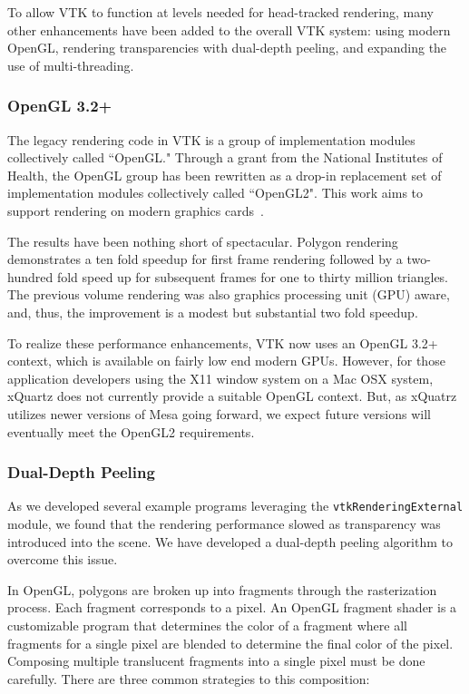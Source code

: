 To allow VTK to function at levels needed for head-tracked rendering,
many other enhancements have been added to the overall VTK system:
using modern OpenGL,
rendering transparencies with dual-depth peeling, and
expanding the use of multi-threading.

\subsubsection{OpenGL 3.2+}

The legacy rendering code in VTK is a group of implementation modules collectively called ``OpenGL."
Through a grant from the National Institutes of Health, the OpenGL group has
been rewritten as a drop-in replacement set of implementation modules
collectively called ``OpenGL2".
This work aims to support rendering on modern graphics cards~\cite{Hanwell:2015}.

The results have been nothing short of spectacular.
Polygon rendering demonstrates a ten fold speedup for first frame rendering followed by a two-hundred fold speed up for subsequent frames for one to thirty million triangles.
The previous volume rendering was also graphics processing unit (GPU) aware, and, thus, the improvement is a modest but substantial two fold speedup. 

To realize these performance enhancements, VTK now uses an OpenGL 3.2+ context, which is available on fairly low end modern GPUs.
However, for those application developers using the X11 window system on a Mac OSX system, xQuartz does not currently provide a suitable OpenGL context.
But, as xQuatrz utilizes newer versions of Mesa going forward, we expect future versions will eventually meet the OpenGL2 requirements.

\subsubsection{Dual-Depth Peeling}

As we developed several example programs leveraging the \texttt{vtkRenderingExternal} module, we found that the rendering performance slowed as transparency was introduced into the scene. We have developed a dual-depth peeling algorithm to overcome this issue.

In OpenGL, polygons are broken up into fragments through the rasterization process.
Each fragment corresponds to a pixel.
An OpenGL fragment shader is a customizable program that determines the color of a fragment where all fragments for a single pixel are blended to determine the final color of the pixel.
Composing multiple translucent fragments into a single pixel must be done carefully.
There are three common strategies to this composition:

